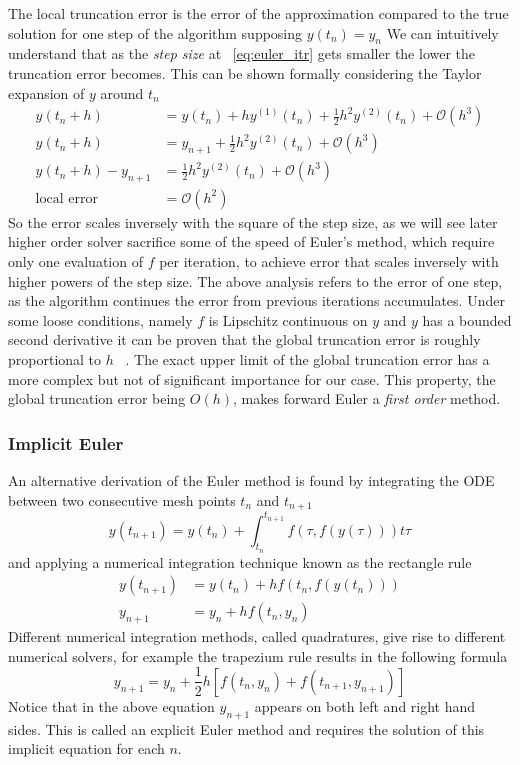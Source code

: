 \documentclass[11pt]{report}
\begin{document}
    The local truncation error is the error of the approximation compared to the true solution for one step of the
    algorithm supposing $y(t_n) = y_n$
    We can intuitively understand that as the \textit{step size} at ~\eqref{eq:euler_itr} gets smaller the lower the
    truncation error becomes.
    This can be shown formally considering the Taylor expansion of $y$ around $t_n$
    \begin{align*}
        y(t_n+h) &= y(t_n) + h y^{(1)}(t_n) + \frac{1}{2} h^2 y^{(2)}(t_n) + \mathcal{O}(h^3) \\
        y(t_n+h) &= y_{n+1}  + \frac{1}{2} h^2 y^{(2)}(t_n) + \mathcal{O}(h^3) \\
        y(t_n+h) - y_{n+1} &= \frac{1}{2} h^2 y^{(2)}(t_n) + \mathcal{O}(h^3) \\
        \text{local error} &= \mathcal{O}(h^2)
    \end{align*}
    So the error scales inversely with the square of the step size, as we will see later higher order solver sacrifice
    some of the speed of Euler's method, which require only one evaluation of $f$ per iteration, to achieve error that
    scales inversely with higher powers of the step size.
    The above analysis refers to the error of one step, as the algorithm continues the error from previous iterations
    accumulates.
    Under some loose conditions, namely $f$ is Lipschitz continuous on $y$ and $y$ has a bounded second derivative it
    can be proven that the global truncation error is roughly proportional to $h$ ~\cite{butcher2016numerical}.
    The exact upper limit of the global truncation error has a more complex but not of significant importance for our
    case.
    This property, the global truncation error being $O(h)$, makes forward Euler a \textit{first order} method.

    \subsubsection{Implicit Euler}
    An alternative derivation of the Euler method is found by integrating the ODE between two consecutive mesh points
    $t_n$ and $t_{n+1}$
    \begin{equation*}
        y(t_{n+1}) = y(t_n) + \int_{t_n}^{t_{n+1}} f(\tau, f(y( \tau)) ) t\tau
    \end{equation*}
    and applying a numerical integration technique known as the rectangle rule
    \begin{align*}
        y(t_{n+1}) &= y(t_n) + h f(t_n, f(y( t_n)) ) \\
        y_{n+1} & = y_n + hf(t_n, y_n)
    \end{align*}
    Different numerical integration methods, called quadratures, give rise to different numerical solvers, for example
    the trapezium rule results in the following formula
    \begin{equation*}
        y_{n+1} =  y_n + \frac{1}{2} h \left[ f(t_n, y_n) + f(t_{n+1}, y_{n+1})\right]
    \end{equation*}
    Notice that in the above equation $y_{n+1}$ appears on both left and right hand sides.
    This is called an explicit Euler method and requires the solution of this implicit equation for each $n$.
\end{document}
